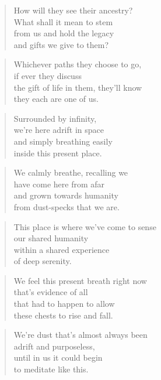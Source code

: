 \documentclass[14pt,a4paper]{article}
\begin{document}
\begin{verse}
How will they see their ancestry?\\
What shall it mean to stem\\
from us and hold the legacy\\
and gifts we give to them?
\end{verse}

\begin{verse}
Whichever paths they choose to go,\\
if ever they discuss\\
the gift of life in them, they’ll know\\
they each are one of us.
\end{verse}


\begin{verse}
Surrounded by infinity,\\
we’re here adrift in space\\
and simply breathing easily\\
inside this present place.
\end{verse}

\begin{verse}
We calmly breathe, recalling we\\
have come here from afar\\
and grown towards humanity\\
from dust-specks that we are.
\end{verse}

\begin{verse}
This place is where we’ve come to sense\\
our shared humanity\\
within a shared experience\\
of deep serenity.
\end{verse}

\begin{verse}
We feel this present breath right now\\
that’s evidence of all\\
that had to happen to allow\\
these chests to rise and fall.
\end{verse}

\begin{verse}
We’re dust that’s almost always been\\
adrift and purposeless,\\
until in us it could begin\\
to meditate like this.
\end{verse}
\end{document}
